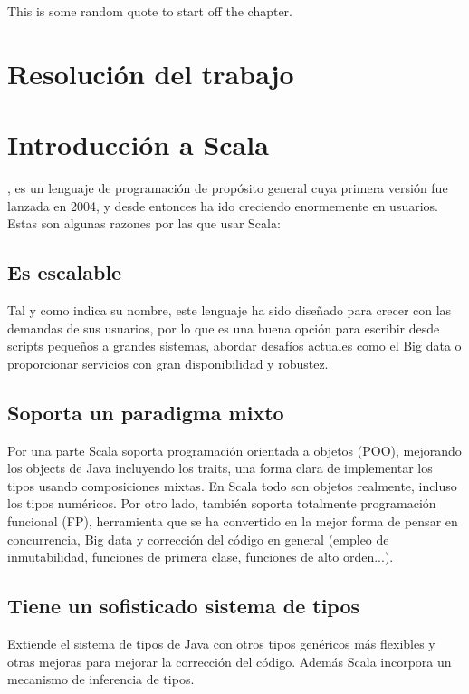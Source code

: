 \begin{savequote}[75mm]
This is some random quote to start off the chapter.
\end{savequote}

\chapter{Resolución del trabajo}
\chapter*{Introducción a Scala}
, es un lenguaje de programación de propósito general cuya primera versión fue lanzada en 2004, y desde entonces ha ido creciendo enormemente en usuarios. Estas son algunas razones por las que usar Scala:
\section*{Es escalable} Tal y como indica su nombre, este lenguaje ha sido diseñado para crecer con las demandas de sus usuarios, por lo que es una buena opción para escribir desde scripts pequeños a grandes sistemas, abordar desafíos actuales como el Big data o proporcionar servicios con gran disponibilidad y robustez.

\section*{Soporta un paradigma mixto} Por una parte \textsf{Scala} soporta programación orientada a objetos (POO), mejorando los objects de Java incluyendo los \textsf{traits}, una forma clara de implementar los tipos usando composiciones mixtas. En \textsf{Scala} todo son objetos realmente, incluso los tipos numéricos. Por otro lado, también soporta totalmente programación funcional (FP),
herramienta que se ha convertido en la mejor forma de pensar en concurrencia, Big data y corrección del código en general (empleo de inmutabilidad, funciones de primera clase, funciones de alto orden...). 

\section*{Tiene un sofisticado sistema de tipos} Extiende el sistema de tipos de Java con otros tipos genéricos más flexibles y otras mejoras para mejorar la corrección del código. Además \textsf{Scala} incorpora un mecanismo de inferencia de tipos.

